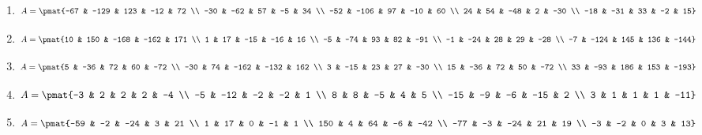 \begin{enumerate}
\item

\begin{align*}
A = \pmat{-67 & -129 & 123 & -12 & 72 \\ -30 & -62 & 57 & -5 & 34 \\ -52 & -106 & 97 & -10 & 60 \\ 24 & 54 & -48 & 2 & -30 \\ -18 & -31 & 33 & -2 & 15}
\end{align*}

\item

\begin{align*}
A = \pmat{10 & 150 & -168 & -162 & 171 \\ 1 & 17 & -15 & -16 & 16 \\ -5 & -74 & 93 & 82 & -91 \\ -1 & -24 & 28 & 29 & -28 \\ -7 & -124 & 145 & 136 & -144}
\end{align*}

\item

\begin{align*}
A = \pmat{5 & -36 & 72 & 60 & -72 \\ -30 & 74 & -162 & -132 & 162 \\ 3 & -15 & 23 & 27 & -30 \\ 15 & -36 & 72 & 50 & -72 \\ 33 & -93 & 186 & 153 & -193}
\end{align*}

\item

\begin{align*}
A = \pmat{-3 & 2 & 2 & 2 & -4 \\ -5 & -12 & -2 & -2 & 1 \\ 8 & 8 & -5 & 4 & 5 \\ -15 & -9 & -6 & -15 & 2 \\ 3 & 1 & 1 & 1 & -11}
\end{align*}

\item

\begin{align*}
A = \pmat{-59 & -2 & -24 & 3 & 21 \\ 1 & 17 & 0 & -1 & 1 \\ 150 & 4 & 64 & -6 & -42 \\ -77 & -3 & -24 & 21 & 19 \\ -3 & -2 & 0 & 3 & 13}
\end{align*}


\end{enumerate}
